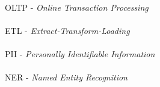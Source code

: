 \paragraph{}OLTP - \textit{Online Transaction Processing}
\paragraph{}ETL - \textit{Extract-Transform-Loading}
\paragraph{}PII - \textit{Personally Identifiable Information}
\paragraph{}NER - \textit{Named Entity Recognition}

\pagebreak







